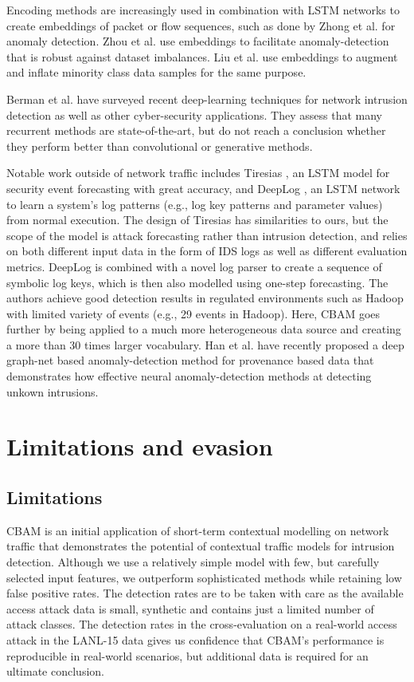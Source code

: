 Encoding methods are increasingly used in combination with LSTM networks to create embeddings of packet or flow sequences, such as done by Zhong et al. \cite{zhong2020helad} for anomaly detection. Zhou et al. \cite{zhou2020variational} use embeddings to facilitate anomaly-detection that is robust against dataset imbalances. Liu et al. \cite{liu2020intrusion} use embeddings to augment and inflate minority class data samples for the same purpose. 

Berman et al. \cite{berman2019survey} have surveyed recent deep-learning techniques for network intrusion detection as well as other cyber-security applications. They assess that many recurrent methods are state-of-the-art, but do not reach a conclusion whether they perform better than convolutional or generative methods.

Notable work outside of network traffic includes Tiresias \cite{shen2018tiresias}, an LSTM model for security event forecasting with great accuracy, 
and DeepLog \cite{du2017deeplog}, an LSTM network to learn a system's log patterns (e.g., log key patterns and parameter values) from normal execution. 
The design of Tiresias has similarities to ours, but the scope of the model is attack forecasting rather than intrusion detection, and relies on both different input data in the form of IDS logs as well as different evaluation metrics. DeepLog is combined with a novel log parser to create a sequence of symbolic log keys, which is then also modelled using one-step forecasting. The authors achieve good detection results in regulated environments such as Hadoop with limited variety of events (e.g., 29 events in Hadoop). Here, CBAM goes further by being applied to a much more heterogeneous data source and creating a more than 30 times larger vocabulary.
Han et al. \cite{han2020unicorn} have recently proposed a deep graph-net based anomaly-detection method for provenance based data that demonstrates  how effective neural anomaly-detection methods at detecting unkown intrusions.


\section{Limitations and evasion}\label{SecF:Resilience}

\subsection{Limitations}\label{SecF:Limitations}

CBAM is an initial application of short-term contextual modelling on network traffic that demonstrates the potential of contextual traffic models for intrusion detection. Although we use a relatively simple model with few, but carefully selected input features, we outperform sophisticated methods while retaining low false positive rates. The detection rates are to be taken with care as the available access attack data is small, synthetic and contains just a limited number of attack classes. The detection rates in the cross-evaluation on a real-world access attack in the LANL-15 data gives us confidence that CBAM's performance is reproducible in real-world scenarios, but additional data is required for an ultimate conclusion. 

